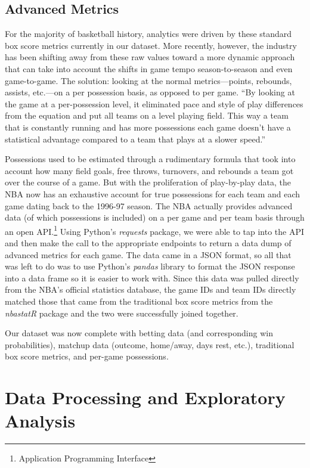 \documentclass [MS] {uclathes}
\begin{document}
\normalsize

\section{Advanced Metrics}
For the majority of basketball history, analytics were driven by these standard box score metrics currently in our dataset. More recently, however, the industry has been shifting away from these raw values toward a more dynamic approach that can take into account the shifts in game tempo season-to-season and even game-to-game. The solution: looking at the normal metrics---points, rebounds, assists, etc.---on a per possession basis, as opposed to per game. ``By looking at the game at a per-possession level, it eliminated pace and style of play differences from the equation and put all teams on a level playing field. This way a team that is constantly running and has more possessions each game doesn't have a statistical advantage compared to a team that plays at a slower speed.'' \cite{nbaadvstats} 

Possessions used to be estimated through a rudimentary formula that took into account how many field goals, free throws, turnovers, and rebounds a team got over the course of a game. But with the proliferation of play-by-play data, the NBA now has an exhaustive account for true possessions for each team and each game dating back to the 1996-97 season. The NBA actually provides advanced data (of which possessions is included) on a per game and per team basis through an open API.\footnote{Application Programming Interface}  Using Python's \emph{requests} package, we were able to tap into the API and then make the call to the appropriate endpoints to return a data dump of advanced metrics for each game. The data came in a JSON format, so all that was left to do was to use Python's \emph{pandas} library to format the JSON response into a data frame so it is easier to work with. Since this data was pulled directly from the NBA's official statistics database, the game IDs and team IDs directly matched those that came from the traditional box score metrics from the \emph{nbastatR} package and the two were successfully joined together. 

Our dataset was now complete with betting data (and corresponding win probabilities), matchup data (outcome, home/away, days rest, etc.), traditional box score metrics, and per-game possessions. 


\chapter{Data Processing and Exploratory Analysis}
\end{document}
